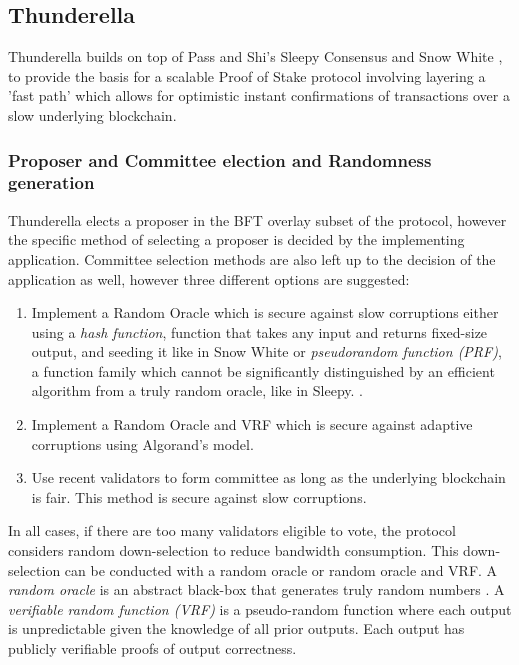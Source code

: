 \documentclass[10pt,journal,compsoc]{IEEEtran}
\begin{document}
\subsection{Thunderella}
Thunderella \cite{Thunderella} builds on top of Pass and Shi's Sleepy Consensus \cite{Sleepy} and Snow White \cite{SnowWhite}, to provide the basis for a scalable
 Proof of Stake protocol involving layering a 'fast path' which allows for optimistic instant confirmations of transactions over a slow underlying blockchain. 

\subsubsection{Proposer and Committee election and Randomness generation}

Thunderella elects a proposer in the BFT overlay subset of the protocol, however the specific method of selecting a proposer is decided by the implementing application. Committee selection methods are also left up to the decision of the application as well, however three different options are suggested:
\begin{enumerate} \item Implement a Random Oracle which is secure against slow corruptions either using a \emph{hash function}, function that takes any input and returns fixed-size output, \indent and seeding it like in Snow White
\cite{SnowWhite} or  \emph{pseudorandom function (PRF)}, a function family which cannot be significantly distinguished by an efficient algorithm from a truly random oracle, like in Sleepy. \cite{Sleepy}.
\item Implement a Random Oracle and VRF which is secure \indent against adaptive corruptions using Algorand's model.
\item Use recent validators to form committee as long as the underlying blockchain is fair. This method is secure against slow corruptions.
\end{enumerate}

In all cases, if there are too many validators eligible to vote, the protocol considers random down-selection to reduce bandwidth consumption. This down-selection can be conducted with a random oracle or random oracle and VRF.
A \emph{random oracle} is an abstract black-box that generates truly random numbers \cite{Mahnush}. A \emph{verifiable random function (VRF)} is a pseudo-random function where each output is unpredictable given the knowledge of all prior outputs. Each output has publicly verifiable proofs of output correctness. \cite{MicaliEtAl} 
\end{document}
